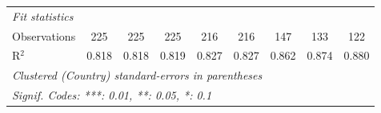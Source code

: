 \begin{tabular}{lcccccccc}
   \midrule \emph{Fit statistics}\\
   Observations                                                  & 225          & 225          & 225          & 216          & 216          & 147     & 133          & 122\\  
   R$^2$                                                         & 0.818        & 0.818        & 0.819        & 0.827        & 0.827        & 0.862   & 0.874        & 0.880\\  
   \midrule
   \multicolumn{9}{l}{\emph{Clustered (Country) standard-errors in parentheses}}\\
   \multicolumn{9}{l}{\emph{Signif. Codes: ***: 0.01, **: 0.05, *: 0.1}}\\
\end{tabular}
\par\endgroup


